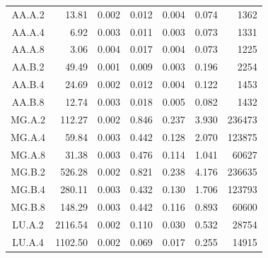 \begin{ThreePartTable}
\begin{longtable}[c]{c*{6}{r}}
    AA.A.2                 & 13.81                               & 0.002                               & 0.012          & 0.004 & 0.074 & 1362   \\
    AA.A.4                 & 6.92                                & 0.003                               & 0.011          & 0.003 & 0.073 & 1331   \\
    AA.A.8                 & 3.06                                & 0.004                               & 0.017          & 0.004 & 0.073 & 1225   \\
    AA.B.2                 & 49.49                               & 0.001                               & 0.009          & 0.003 & 0.196 & 2254   \\
    AA.B.4                 & 24.69                               & 0.002                               & 0.012          & 0.004 & 0.122 & 1453   \\
    AA.B.8                 & 12.74                               & 0.003                               & 0.018          & 0.005 & 0.082 & 1432   \\
    MG.A.2                 & 112.27                              & 0.002                               & 0.846          & 0.237 & 3.930 & 236473 \\
    MG.A.4                 & 59.84                               & 0.003                               & 0.442          & 0.128 & 2.070 & 123875 \\
    MG.A.8                 & 31.38                               & 0.003                               & 0.476          & 0.114 & 1.041 & 60627  \\
    MG.B.2                 & 526.28                              & 0.002                               & 0.821          & 0.238 & 4.176 & 236635 \\
    MG.B.4                 & 280.11                              & 0.003                               & 0.432          & 0.130 & 1.706 & 123793 \\
    MG.B.8                 & 148.29                              & 0.003                               & 0.442          & 0.116 & 0.893 & 60600  \\
    LU.A.2                 & 2116.54                             & 0.002                               & 0.110          & 0.030 & 0.532 & 28754  \\
    LU.A.4                 & 1102.50                             & 0.002                               & 0.069          & 0.017 & 0.255 & 14915  \\

\end{longtable}
\end{ThreePartTable}
